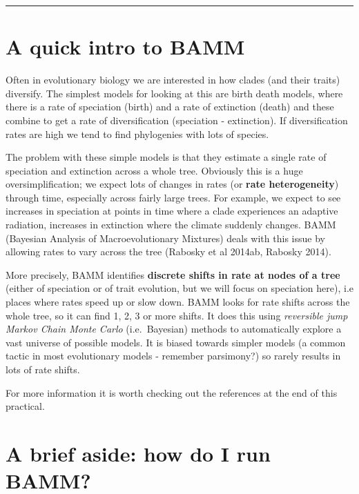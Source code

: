 \documentclass[]{book}
\begin{document}
\begin{center}\rule{0.5\linewidth}{\linethickness}\end{center}

\section{A quick intro to BAMM}\label{a-quick-intro-to-bamm}

Often in evolutionary biology we are interested in how clades (and their
traits) diversify. The simplest models for looking at this are birth
death models, where there is a rate of speciation (birth) and a rate of
extinction (death) and these combine to get a rate of diversification
(speciation - extinction). If diversification rates are high we tend to
find phylogenies with lots of species.

The problem with these simple models is that they estimate a single rate
of speciation and extinction across a whole tree. Obviously this is a
huge oversimplification; we expect lots of changes in rates (or
\textbf{rate heterogeneity}) through time, especially across fairly
large trees. For example, we expect to see increases in speciation at
points in time where a clade experiences an adaptive radiation,
increases in extinction where the climate suddenly changes. BAMM
(Bayesian Analysis of Macroevolutionary Mixtures) deals with this issue
by allowing rates to vary across the tree (Rabosky et al 2014ab, Rabosky
2014).

More precisely, BAMM identifies \textbf{discrete shifts in rate at nodes
of a tree} (either of speciation or of trait evolution, but we will
focus on speciation here), i.e places where rates speed up or slow down.
BAMM looks for rate shifts across the whole tree, so it can find 1, 2, 3
or more shifts. It does this using \emph{reversible jump Markov Chain
Monte Carlo} (i.e.~Bayesian) methods to automatically explore a vast
universe of possible models. It is biased towards simpler models (a
common tactic in most evolutionary models - remember parsimony?) so
rarely results in lots of rate shifts.

For more information it is worth checking out the references at the end
of this practical.

\section{A brief aside: how do I run
BAMM?}\label{a-brief-aside-how-do-i-run-bamm}
\end{document}
